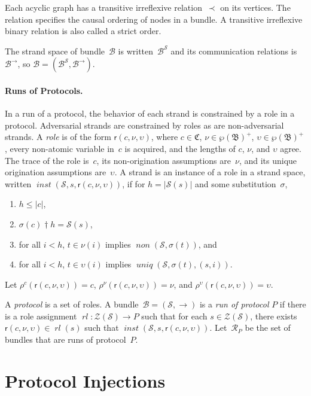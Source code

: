 \documentclass[12pt]{article}
\newcommand{\fn}[1]{\ensuremath{\operatorname{\mathit{#1}}}}
\newcommand{\typ}{\mathbin:}
\newcommand{\prefix}[2]{#1\dagger#2}
\newcommand{\pow}[1]{\wp(#1)}
\newcommand{\alg}[1]{\ensuremath{\mathfrak{#1}}}
\newcommand{\atm}{\alg{B}}
\newcommand{\ssp}{\ensuremath{\mathcal{S}}}
\newcommand{\bun}{\ensuremath{\mathcal{B}}}
\newcommand{\strands}{\ensuremath{\mathcal{Z}}}
\newcommand{\run}{\mathcal{R}}
\newcommand{\tr}{\ensuremath{\mathfrak C}}
\newcommand{\rl}{\fn{rl}}
\newcommand{\role}{\mathsf{r}}
\begin{document}
Each acyclic graph has a transitive irreflexive relation~$\prec$ on
its vertices.  The relation specifies the causal ordering of nodes in
a bundle.  A transitive irreflexive binary relation is also called a
strict order.

The strand space of bundle~{\bun} is written~$\bun^\ssp$ and its
communication relations is~$\bun^\to$, so
$\bun=(\bun^\ssp,\bun^\to)$.

\paragraph{Runs of Protocols.}
In a run of a protocol, the behavior of each strand is constrained by
a role in a protocol.  Adversarial strands are constrained by roles as
are non-adversarial strands.  A \emph{role} is of the form
$\role(c,\nu,\upsilon)$, where $c\in\tr$, $\nu\in\pow{\atm}^+$,
$\upsilon\in\pow{\atm}^+$, every non-atomic variable in~$c$ is
acquired, and the lengths of $c$, $\nu$, and $\upsilon$ agree.  The
trace of the role is~$c$, its non-origination assumptions are~$\nu$,
and its unique origination assumptions are~$\upsilon$.  A strand is an
instance of a role in a strand space, written
$\fn{inst}(\ssp,s,\role(c,\nu,\upsilon))$, if for $h=|\ssp(s)|$ and
some substitution~$\sigma$,
\begin{enumerate}
\item $h\leq|c|$,
\item $\prefix{\sigma(c)}{h}=\ssp(s)$,
\item for all $i<h$, $t\in \nu(i)$ implies $\fn{non}(\ssp,\sigma(t))$, and
\item for all $i<h$, $t\in \upsilon(i)$ implies
  $\fn{uniq}(\ssp,\sigma(t),(s,i))$.
\end{enumerate}
Let $\rho^c(\role(c,\nu,\upsilon))=c$,
$\rho^\nu(\role(c,\nu,\upsilon))=\nu$, and
$\rho^\upsilon(\role(c,\nu,\upsilon))=\upsilon$.

A \emph{protocol} is a set of roles.  A bundle~$\bun=(\ssp,\to)$ is a
\emph{run of protocol} $P$ if there is a role assignment
$\rl\typ\strands(\ssp)\to P$ such that for each $s\in\strands(\ssp)$, there
exists $\role(c,\nu,\upsilon)\in\rl(s)$ such that
$\fn{inst}(\ssp,s,\role(c,\nu,\upsilon))$.  Let~$\run_P$ be the set of
bundles that are runs of protocol~$P$.

\section{Protocol Injections}\label{sec:protocol injections}
\end{document}
